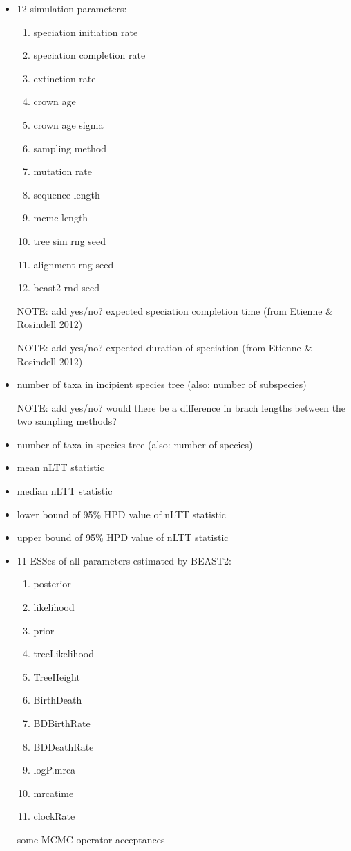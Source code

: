 \documentclass{article}
\begin{document}
\begin{itemize}  
  \item 12 simulation parameters:
  \begin{enumerate}  
    \item speciation initiation rate
    \item speciation completion rate
    \item extinction rate
    \item crown age
    \item crown age sigma
    \item sampling method
    \item mutation rate
    \item sequence length
    \item mcmc length
    \item tree sim rng seed
    \item alignment rng seed
    \item beast2 rnd seed
  \end{enumerate}
  \item [NOTE: add yes/no?] expected speciation completion time (from Etienne & Rosindell 2012)
  \item [NOTE: add yes/no?] expected duration of speciation (from Etienne & Rosindell 2012)
  \item number of taxa in incipient species tree (also: number of subspecies)
  \item [NOTE: add yes/no?] would there be a difference in brach lengths between the two sampling methods?
  \item number of taxa in species tree (also: number of species)
  \item mean nLTT statistic
  \item median nLTT statistic
  \item lower bound of 95\% HPD value of nLTT statistic
  \item upper bound of 95\% HPD value of nLTT statistic
  \item 11 ESSes of all parameters estimated by BEAST2:
  \begin{enumerate}  
    \item posterior
    \item likelihood 
    \item prior 
    \item treeLikelihood 
    \item TreeHeight 
    \item BirthDeath 
    \item BDBirthRate 
    \item BDDeathRate 
    \item logP.mrca 
    \item mrcatime 
    \item clockRate
  \end{enumerate}
  \item [some] MCMC operator acceptances
\end{itemize}
\end{document}
